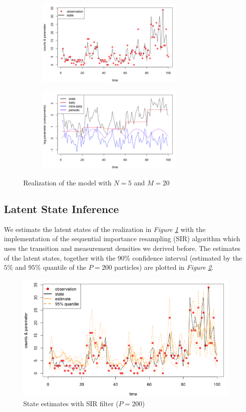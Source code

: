 \documentclass[11pt, oneside]{scrreprt}   	%
\begin{document}
\begin{figure}[h!]
\centering
\begin{subfigure}{.5\textwidth}
  \centering
  \includegraphics[width=73mm]{../../images/hdpm-realization.png}
\end{subfigure}%
\begin{subfigure}{.5\textwidth}
  \centering
  \includegraphics[width=73mm]{../../images/hdpm-log-param.png}
\end{subfigure}
\caption{Realization of the model with $N=5$ and $M=20$}
\label{fig:hdpm_realization}
\end{figure}

\subsection{Latent State Inference}
We estimate the latent states of the realization in \textit{Figure \ref{fig:hdpm_realization}} with the implementation of the sequential importance resampling (SIR) algorithm which uses the transition and measurement densities we derived before. The estimates of the latent states, together with the $90\%$ confidence interval (estimated by the $5\%$ and $95\%$ quantile of the $P=200$ particles) are plotted in \textit{Figure \ref{fig:hdpm_est}}.

\begin{figure}[h!]
\centering
\includegraphics[width=115mm]{../../images/hdpm-est.png}
\caption{State estimates with SIR filter ($P=200$)}
\label{fig:hdpm_est}
\end{figure}
\end{document}
